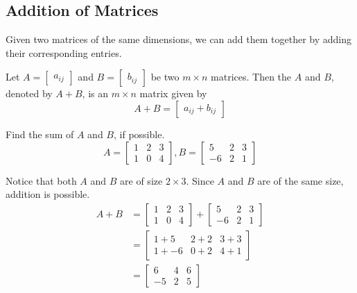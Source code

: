 \documentclass{ximera}
\begin{document}
\subsection*{Addition of Matrices}

Given two matrices of the same dimensions, we can add them together by adding their corresponding entries.
\begin{definition}\label{def:additionofmatrices}
Let $A=\begin{bmatrix} a_{ij}\end{bmatrix} $ and $B=\begin{bmatrix} b_{ij}\end{bmatrix}$ be two
$m\times n$ matrices. Then the  $A$ and $B$, denoted by $A+B$,  is an $m \times n$
matrix  given by 
$$A+B=\begin{bmatrix}a_{ij}+b_{ij}\end{bmatrix}$$

\end{definition}

\begin{example}\label{ex:samesizematrixaddition}
Find the sum of $A$ and $B$, if possible.
\begin{equation*}
A = \begin{bmatrix}
1 & 2 & 3 \\
1 & 0 & 4
\end{bmatrix},
B = \begin{bmatrix}
5 & 2 & 3 \\
-6 & 2 & 1
\end{bmatrix}
\end{equation*}
\begin{explanation}
Notice that both $A$ and $B$ are of size $2 \times 3$. 
Since $A$ and $B$ are of the same size, addition is possible. 
\begin{align*}
A + B &= \begin{bmatrix}
1 & 2 & 3 \\
1 & 0 & 4
\end{bmatrix}
+
\begin{bmatrix}
5 & 2 & 3 \\
-6 & 2 & 1
\end{bmatrix}\\
&=
\begin{bmatrix}
1+5 & 2+2 & 3+3 \\
1+ -6 & 0+2 & 4+1
\end{bmatrix}\\
&=
\begin{bmatrix}
6 & 4 & 6 \\
-5 & 2 & 5
\end{bmatrix}
\end{align*}
\end{explanation}
\end{example}
\end{document}
